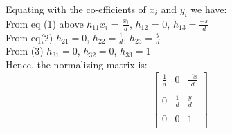 \documentclass{article}
\begin{document}
Equating with the co-efficients of $x_{i}$ and $y_{i}$ we have: \\

From eq (1) above
$h_{11}x_{i}$ = $\frac{x_{i}}{d}$, 
$h_{12}$ = 0, 
$h_{13} = \frac{\overline{-x}}{d}$ \\

From eq(2)
$h_{21} = 0$,
$h_{22} = \frac{1}{d}$,
$h_{23} = \frac{\overline{y}}{d}$ \\

From (3)
$h_{31} = 0$,
$h_{32} = 0$,
$h_{33} = 1$  \\


Hence, the normalizing matrix is: \\
\[
\begin{bmatrix}
    \frac{1}{d} &  0 &  \frac{\overline{-x}}{d}\\ \\
    0 & \frac{1}{d} &  \frac{\overline{y}}{d}\\ \\
    0 &  0 & 1\\
\end{bmatrix} 
\]
\end{document}
